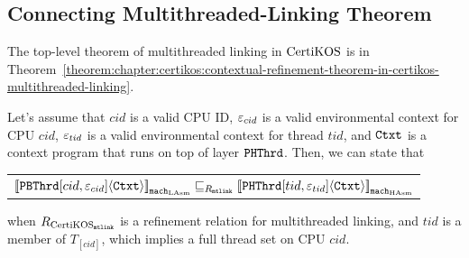 \subsection{Connecting Multithreaded-Linking Theorem}
\label{chapter:certikos:subsec:connecting-multithreaded-theroem}

The top-level theorem of
multithreaded linking in $\mathrm{CertiKOS}$  is in Theorem~\ref{theorem:chapter:certikos:contextual-refinement-theorem-in-certikos-multithreaded-linking}.

\begin{theorem}
\label{theorem:chapter:certikos:contextual-refinement-theorem-in-certikos-multithreaded-linking}
Let's assume that $cid$ is a valid CPU ID, ${\varepsilon}_{cid}$ is a valid
environmental context for CPU $cid$, 
${\varepsilon}_{tid}$ is a valid
environmental context for thread $tid$, 
and ${\mathrm{\texttt{Ctxt}}}$ is a
 context program that runs on top of layer ${\mathrm{\texttt{PHThrd}}}$. 
 Then, we can state that
 \begin{center}
\begin{tabular}{c}
${[\![{{\mathrm{\texttt{PBThrd}}}[cid, {\varepsilon}_{cid}]} \langle {{\mathrm{\texttt{Ctxt}}}} \rangle]\!]}_{{\mathrm{\texttt{mach}}}_{\mathrm{LAsm}}} \sqsubseteq_{R_{{\mathrm{\texttt{mtlink}}}}} {[\![{{\mathrm{\texttt{PHThrd}}}[tid, {\varepsilon}_{tid}]} \langle {{\mathrm{\texttt{Ctxt}}}} \rangle]\!]}_{{{\mathrm{\texttt{mach}}}_{\mathrm{HAsm}}}}$\\
\end{tabular}
\end{center}
when ${R_{\mathrm{CertiKOS}_{\mathrm{\texttt{mtlink}}}}}$ is a refinement relation for multithreaded linking, and $tid$ is a member of $T_{[cid]}$,
which implies a full thread set on CPU $cid$.
\end{theorem}


